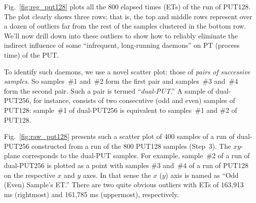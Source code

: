 \documentclass[letter]{ieice}
\begin{document}
Fig.~\ref{fig:reg_put128} plots all the 800 elapsed times (ETs) of the run of PUT128.
The plot clearly shows three rows; that is, 
the top and middle rows represent over a dozen of outliers far from 
the rest of the samples clustered in the bottom row. 
We'll now drill down into these outliers to 
show how to reliably eliminate the indirect influence of 
some ``infrequent, long-running daemons'' on PT (\hbox{process} time) of the PUT.

To identify such daemons, we use a novel \hbox{scatter} plot: 
those of {\em pairs of successive samples}{\color{blue}. 
So samples~\#{1} and~\#{2} form the first pair and samples~\#{3} and~\#{4} 
form the second pair.
Such a pair is termed ``\hbox{{\it dual-PUT}}.'' 
A sample of \hbox{dual-PUT256}, for instance, 
consists of two consecutive (odd and even) 
samples of PUT128: 
sample~\#{1} of dual-PUT256 is equivalent 
to samples~\#{1} and \#{2} of PUT128.}

Fig.~\ref{fig:raw_put128} presents such a scatter plot 
of 400 samples of a run of \hbox{dual-PUT256} constructed 
from a run of the 800 PUT128 samples (Step~3). 
{\color{blue} The $xy$-plane corresponds to the dual-PUT samples. 
For example, \hbox{sample}~\#{2} of a run of dual-PUT256 
is plotted as a point with samples \#{3} and~\#{4} of a run of PUT128 
on the respective $x$ and $y$ axes. In that sense 
the $x$ ($y$) axis is named as ``Odd (Even) Sample's ET.''}
There are two quite obvious outliers with ETs 
of 163,913 ms (rightmost) and 161,785 ms (uppermost), respectively.
\end{document}
